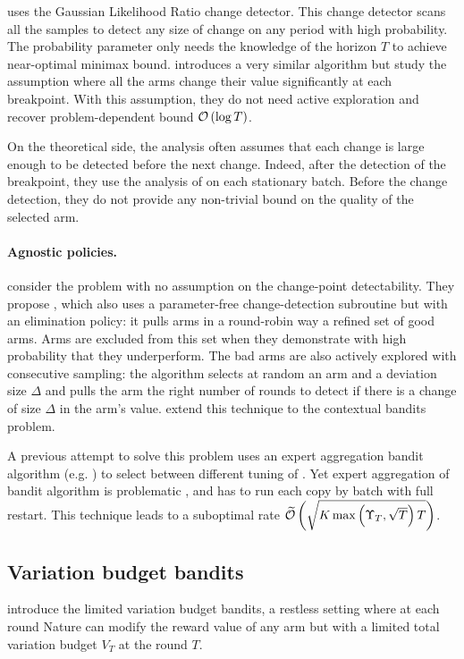 \GLRUCB \citep{besson2019generalized} uses the Gaussian Likelihood Ratio change detector. This change detector scans all the samples to detect any size of change on any period with high probability. The probability parameter only needs the knowledge of the horizon $T$ to achieve near-optimal minimax bound. \citet{mukherjee2019distribution} introduces a very similar algorithm but study the assumption where all the arms change their value significantly at each breakpoint. With this assumption, they do not need active exploration and recover problem-dependent bound $\mathcal{O}\left(\log{T}\right)$.

On the theoretical side, the analysis often assumes that each change is large enough to be detected before the next change. Indeed, after the detection of the breakpoint, they use the analysis of \UCB on each stationary batch. Before the change detection, they do not provide any non-trivial bound on the quality of the selected arm. 


\paragraph{Agnostic policies.}
\citet{auer2019adaptively} consider the problem with no assumption on the change-point detectability. They propose \ADSWITCH, which also uses a parameter-free change-detection subroutine but with an elimination policy: it pulls arms in a round-robin way a refined set of good arms. Arms are excluded from this set when they demonstrate with high probability that they underperform. The bad arms are also actively explored with consecutive sampling: the algorithm selects at random an arm and a deviation size $\Delta$ and pulls the arm the right number of rounds to detect if there is a change of size $\Delta$ in the arm's value. \citet{chen2019new} extend this technique to the contextual bandits problem.

A previous attempt \citep{cheung2019new} to solve this problem uses an expert aggregation bandit algorithm (e.g. \EXPfour) to select between different tuning of \SWUCB . Yet expert aggregation of bandit algorithm is problematic \citep{agarwal2017corralling, besson2018aggregation}, and \citet{cheung2019new} has to run each copy by batch with full restart. This technique leads to a suboptimal rate $\widetilde{\mathcal{O}}\left(\sqrt{K \max\left(\Upsilon_T, \sqrt{T}\right) T}\right)$.


\subsection{Variation budget bandits}
\label{subsec:variation}
\citet{besbes2014stochastic} introduce the limited variation budget bandits, a restless setting where at each round Nature can modify the reward value of any arm but with a limited total variation budget $V_T$ at the round $T$. 

